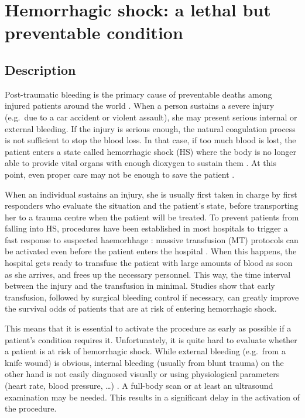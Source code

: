 	\section{Hemorrhagic shock: a lethal but preventable condition}
	\label{shock}
		\subsection{Description}
Post-traumatic bleeding is the primary cause of preventable deaths among injured patients around the world \cite{WHO}\cite{urban}. When a person sustains a severe injury (e.g.\ due to a car accident or violent assault), she may present serious internal or external bleeding. If the injury is serious enough, the natural coagulation process is not sufficient to stop the blood loss. In that case, if too much blood is lost, the patient enters a state called hemorrhagic shock (HS) where the body is no longer able to provide vital organs with enough dioxygen to sustain them \cite{HS_def}. At this point, even proper care may not be enough to save the patient \cite{dutton2007current}.

When an individual sustains an injury, she is usually first taken in charge by first responders who evaluate the situation and the patient's state, before transporting her to a trauma centre when the patient will be treated.
To prevent patients from falling into HS, procedures have been established in most hospitals to trigger a fast response to suspected haemorhhage \cite{pommerening2015gestalt}: massive transfusion (MT) protocols can be activated even before the patient enters the hospital \cite{malone2006MT}. When this happens, the hospital gets ready to transfuse the patient with large amounts of blood as soon as she arrives, and frees up the necessary personnel. This way, the time interval between the injury and the transfusion in minimal. Studies \cite{hoyt1994death} \cite{martin2009combatSupport} show that early transfusion, followed by surgical bleeding control if necessary, can greatly improve the survival odds of patients that are at risk of entering hemorrhagic shock.

This means that it is essential to activate the procedure as early as possible if a patient's condition requires it. Unfortunately, it is quite hard to evaluate whether a patient is at risk of hemorrhagic shock\cite{pommerening2015gestalt}. While external bleeding (e.g.\ from a knife wound) is obvious, internal bleeding (usually from blunt trauma) on the other hand is not easily diagnosed visually or using physiological parameters (heart rate, blood pressure, \ldots) \cite{frank2010bloodLoss}. A full-body scan or at least an ultrasound examination may be needed\cite{perera2010rush}. This results in a significant delay in the activation of the procedure.

